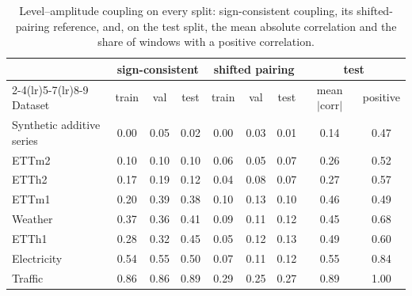 \documentclass[twocolumn,natbib]{svjour3}
\begin{document}
{\begin{table}[t]
\centering
\caption{Level--amplitude coupling on every split: sign-consistent coupling, its shifted-pairing reference, and, on the test split, the mean absolute correlation and the share of windows with a positive correlation.}
\label{tab:coupling}
\footnotesize
\setlength{\tabcolsep}{6pt}
\begin{tabular}{lcccccccc}
\toprule
 & \multicolumn{3}{c}{sign-consistent} & \multicolumn{3}{c}{shifted pairing} & \multicolumn{2}{c}{test} \\
\cmidrule(lr){2-4}\cmidrule(lr){5-7}\cmidrule(lr){8-9}
Dataset & train & val & test & train & val & test & mean $|\mathrm{corr}|$ & positive \\
\midrule
Synthetic additive series & 0.00 & 0.05 & 0.02 & 0.00 & 0.03 & 0.01 & 0.14 & 0.47 \\
\midrule
ETTm2 & 0.10 & 0.10 & 0.10 & 0.06 & 0.05 & 0.07 & 0.26 & 0.52 \\
ETTh2 & 0.17 & 0.19 & 0.12 & 0.04 & 0.08 & 0.07 & 0.27 & 0.57 \\
ETTm1 & 0.20 & 0.39 & 0.38 & 0.10 & 0.13 & 0.10 & 0.46 & 0.49 \\
Weather & 0.37 & 0.36 & 0.41 & 0.09 & 0.11 & 0.12 & 0.45 & 0.68 \\
ETTh1 & 0.28 & 0.32 & 0.45 & 0.05 & 0.12 & 0.13 & 0.49 & 0.60 \\
Electricity & 0.54 & 0.55 & 0.50 & 0.07 & 0.11 & 0.12 & 0.55 & 0.84 \\
Traffic & 0.86 & 0.86 & 0.89 & 0.29 & 0.25 & 0.27 & 0.89 & 1.00 \\
\bottomrule
\end{tabular}
\end{table}
}



\end{document}
